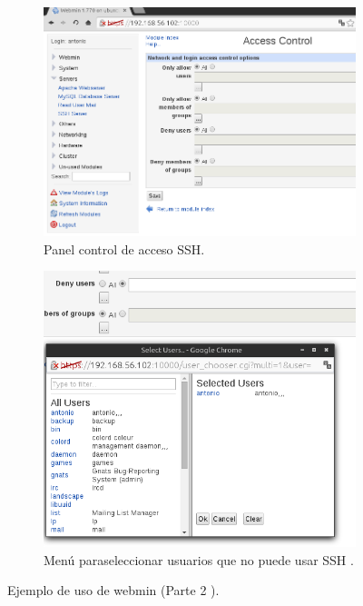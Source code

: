     \begin{figure}[H]
    \centering
     \begin{subfigure}[b]{0.7\textwidth}
        \includegraphics[width=\textwidth]{imagenes/img27}
    \caption{Panel control de acceso SSH.} 
    \label{fig24} 
    \end{subfigure}
    
    \begin{subfigure}[b]{0.7\textwidth}
       \includegraphics[width=\textwidth]{imagenes/img28}
    \caption{Menú paraseleccionar usuarios que no puede usar SSH .} 
    \label{fig25} 
    \end{subfigure}
    \caption{Ejemplo de uso de webmin (Parte 2 ).}  

\end{figure}






